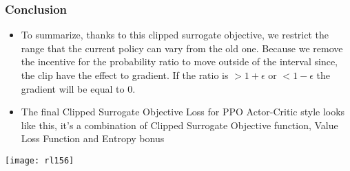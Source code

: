 \begin{frame}[fragile]\frametitle{Conclusion}

\begin{itemize}
\item To summarize, thanks to this clipped surrogate objective, we restrict the range that the current policy can vary from the old one. Because we remove the incentive for the probability ratio to move outside of the interval since, the clip have the effect to gradient. If the ratio is $> 1 + \epsilon$ or $< 1 - \epsilon$ the gradient will be equal to 0.

\item  The final Clipped Surrogate Objective Loss for PPO Actor-Critic style looks like this, it's a combination of Clipped Surrogate Objective function, Value Loss Function and Entropy bonus
\end{itemize}

\begin{center}
\texttt{[image: rl156]}
\end{center}
\end{frame}